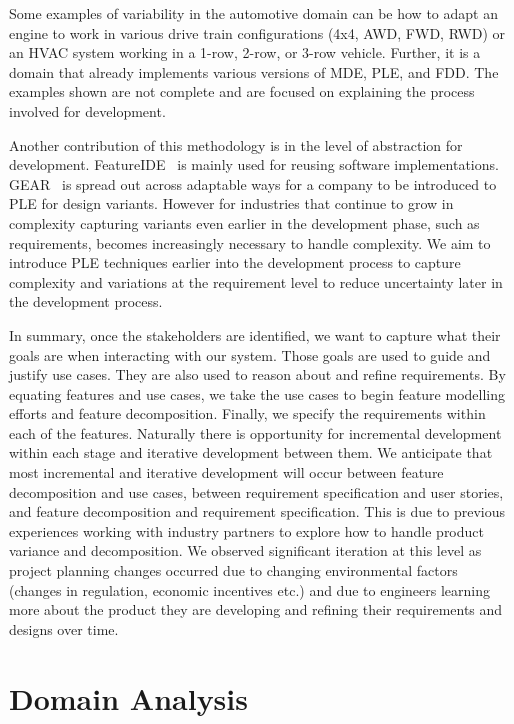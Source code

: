 Some examples of variability in the automotive domain can be how to adapt an engine to work in various drive train configurations (4x4, AWD, FWD, RWD) or an HVAC system working in a 1-row, 2-row, or 3-row vehicle. Further, it is a domain that already implements various versions of \ac{MDE}, \ac{PLE}, and \ac{FDD}. The examples shown are not complete and are focused on explaining the process involved for development. 

Another contribution of this methodology is in the level of abstraction for development. FeatureIDE~\cite{thum2014featureide} is mainly used for reusing software implementations. GEAR~\cite{GEARS} is spread out across adaptable ways for a company to be introduced to \ac{PLE} for design variants. However for industries that continue to grow in complexity capturing variants even earlier in the development phase, such as requirements, becomes increasingly necessary to handle complexity. We aim to introduce \ac{PLE} techniques earlier into the development process to capture complexity and variations at the requirement level to reduce uncertainty later in the development process.

In summary, once the stakeholders are identified, we want to capture what their goals are when interacting with our system. Those goals are used to guide and justify use cases. They are also used to reason about and refine requirements. By equating features and use cases, we take the use cases to begin feature modelling efforts and feature decomposition. Finally, we specify the requirements within each of the features. Naturally there is opportunity for incremental development within each stage and iterative development between them. We anticipate that most incremental and iterative development will occur between feature decomposition and use cases, between requirement specification and user stories, and feature decomposition and requirement specification. This is due to previous experiences working with industry partners to explore how to handle product variance and decomposition. We observed significant iteration at this level as project planning changes occurred due to changing environmental factors (changes in regulation, economic incentives etc.) and due to engineers learning more about the product they are developing and refining their requirements and designs over time.

\section{Domain Analysis}

